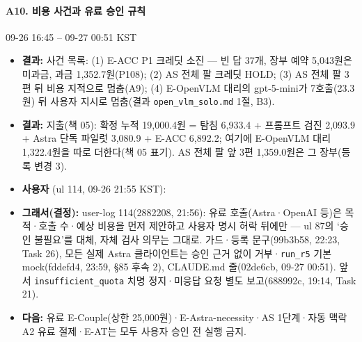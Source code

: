\paragraph{A10. 비용 사건과 유료 승인 규칙}
{\small 09-26 16:45 -- 09-27 00:51 KST}
\begin{itemize}
  \item \textbf{결과:} 사건 목록: (1) E-ACC P1 크레딧 소진 --- 빈 답 37개, 장부 예약 5,043원은 미과금, 과금 1,352.7원(P108); (2) AS 전체 팔 크레딧 HOLD; (3) AS 전체 팔 3편 뒤 비용 지적으로 멈춤(A9); (4) E-OpenVLM 대리의 gpt-5-mini가 7호출(23.3원) 뒤 사용자 지시로 멈춤(결과 \texttt{open\_\allowbreak{}vlm\_\allowbreak{}solo.\allowbreak{}md} 1절, B3).
  \item \textbf{결과:} 지출(책 05): 확정 누적 19,000.4원 = 탐침 6,933.4 + 프롬프트 검진 2,093.9 + Astra 단독 파일럿 3,080.9 + E-ACC 6,892.2; 여기에 E-OpenVLM 대리 1,322.4원을 따로 더한다(책 05 표기). AS 전체 팔 앞 3편 1,359.0원은 그 장부(등록 변경 3).
  \item \textbf{사용자} (ul 114, 09-26 21:55 KST): 
  \item \textbf{그래서(결정):} user-log 114(2882208, 21:56): 유료 호출(Astra·OpenAI 등)은 목적·호출 수·예상 비용을 먼저 제안하고 사용자 명시 허락 뒤에만 --- ul 87의 `승인 불필요'를 대체, 자체 검사 의무는 그대로. 가드·등록 문구(99b3b58, 22:23, Task 26), 모든 실제 Astra 클라이언트는 승인 근거 없이 거부·\texttt{run\_\allowbreak{}r5} 기본 mock(fddefd4, 23:59, §85 후속 2), CLAUDE.md 줄(02de6cb, 09-27 00:51). 앞서 \texttt{insufficient\_\allowbreak{}quota} 치명 정지·미응답 요청 별도 보고(688992c, 19:14, Task 21).
  \item \textbf{다음:} 유료 E-Couple(상한 25,000원)·E-Astra-necessity·AS 1단계·자동 맥락 A2 유료 절제·E-AT는 모두 사용자 승인 전 실행 금지.
\end{itemize}
